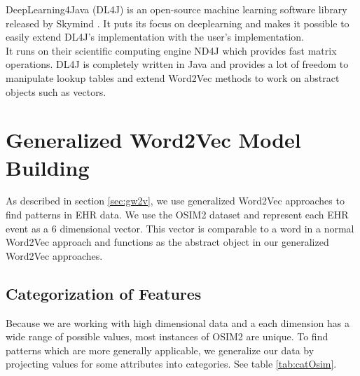 DeepLearning4Java (DL4J) is an open-source machine learning software library released by Skymind \cite{dl4j:article}. It puts its focus on deeplearning and makes it possible to easily extend DL4J's implementation with the user's implementation. \\
It runs on their scientific computing engine ND4J which provides fast matrix operations. DL4J is completely written in Java and provides a lot of freedom to manipulate lookup tables and extend Word2Vec methods to work on abstract objects such as vectors.


\section{Generalized Word2Vec Model Building}
\label{sec:convertionClusters}

As described in section \ref{sec:gw2v}, we use generalized Word2Vec approaches to find patterns in EHR data. We use the OSIM2 dataset and represent each EHR event as a $6$ dimensional vector. This vector is comparable to a word in a normal Word2Vec approach and functions as the abstract object in our generalized Word2Vec approaches. 

\subsection{Categorization of Features}
\label{sec:categorizationImpl}

Because we are working with high dimensional data and a each dimension has a wide range of possible values, most instances of OSIM2 are unique. To find patterns which are more generally applicable, we generalize our data by projecting values for some attributes into categories. See table \ref{tab:catOsim}. \\

